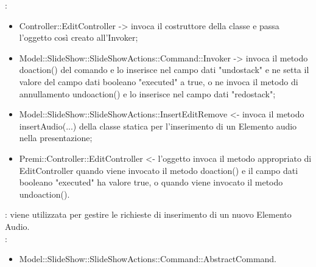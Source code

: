 {{	\textbf{\relaz}: 
	\begin{itemize}
		\item Controller::\-EditController -> invoca il costruttore della classe e passa l’oggetto così creato all’Invoker;
		\item Model::\-SlideShow::\-SlideShowActions::\-Command::\-Invoker -> invoca il metodo doaction() del comando e lo inserisce nel campo dati "undostack" e ne setta il valore del campo dati booleano "executed" a true, o ne invoca il metodo di annullamento undoaction() e lo inserisce nel campo dati "redostack";
		\item Model::\-SlideShow::\-SlideShowActions::\-InsertEditRemove <- invoca il metodo insertAudio(...) della classe statica per l’inserimento di un Elemento audio nella presentazione;
		\item Premi::\-Controller::\-EditController <- l'oggetto invoca il metodo appropriato di EditController quando viene invocato il metodo doaction() e il campo dati booleano "executed" ha valore true, o quando viene invocato il metodo undoaction().
	\end{itemize}	
	\textbf{\interfacce}: viene utilizzata per gestire le richieste di inserimento di un nuovo Elemento Audio.\\
	\textbf{\base}: 
		\begin{itemize}
		\item Model::\-SlideShow::\-SlideShowActions::\-Command::\-AbstractCommand.
		\end{itemize}
		}
	}
